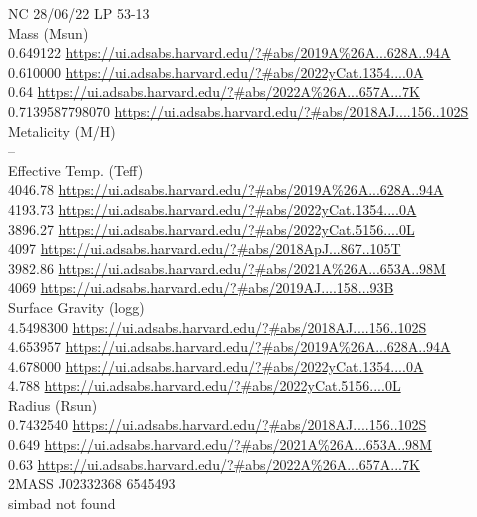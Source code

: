 NC 28/06/22
LP 53-13\\

Mass (Msun)\\
0.649122 \url{https://ui.adsabs.harvard.edu/?#abs/2019A%26A...628A..94A}\\
0.610000 \url{https://ui.adsabs.harvard.edu/?#abs/2022yCat.1354....0A}\\
0.64 \url{https://ui.adsabs.harvard.edu/?#abs/2022A%26A...657A...7K}\\
0.7139587798070 \url{https://ui.adsabs.harvard.edu/?#abs/2018AJ....156..102S}\\
Metalicity (M/H)\\
--\\
Effective Temp. (Teff)\\
4046.78 \url{https://ui.adsabs.harvard.edu/?#abs/2019A%26A...628A..94A}\\
4193.73 \url{https://ui.adsabs.harvard.edu/?#abs/2022yCat.1354....0A}\\
3896.27 \url{https://ui.adsabs.harvard.edu/?#abs/2022yCat.5156....0L}\\
4097 \url{https://ui.adsabs.harvard.edu/?#abs/2018ApJ...867..105T}\\
3982.86 \url{https://ui.adsabs.harvard.edu/?#abs/2021A%26A...653A..98M}\\
4069 \url{https://ui.adsabs.harvard.edu/?#abs/2019AJ....158...93B}\\	
Surface Gravity (logg)\\
4.5498300 \url{https://ui.adsabs.harvard.edu/?#abs/2018AJ....156..102S}\\
4.653957 \url{https://ui.adsabs.harvard.edu/?#abs/2019A%26A...628A..94A}\\
4.678000 \url{https://ui.adsabs.harvard.edu/?#abs/2022yCat.1354....0A}\\
4.788 \url{https://ui.adsabs.harvard.edu/?#abs/2022yCat.5156....0L}\\
Radius (Rsun)\\
0.7432540 \url{https://ui.adsabs.harvard.edu/?#abs/2018AJ....156..102S}\\
0.649 \url{https://ui.adsabs.harvard.edu/?#abs/2021A%26A...653A..98M}\\
0.63 \url{https://ui.adsabs.harvard.edu/?#abs/2022A%26A...657A...7K}\\

2MASS J02332368 6545493\\
simbad not found\\